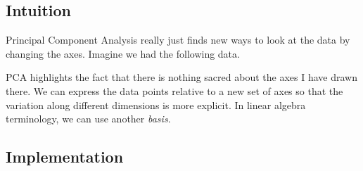 \documentclass[12pt]{article}
\begin{document}
\subsection{Intuition}

Principal Component Analysis really just finds new ways
to look at the data by changing the axes.  Imagine we had
the following data.

PCA highlights the fact that there is nothing sacred
about the axes I have drawn there.  We can express the
data points relative to a new set of axes so that the
variation along different dimensions is more explicit. In
linear algebra terminology, we can use another \emph{basis}.

\subsection{Implementation}





\end{document}
